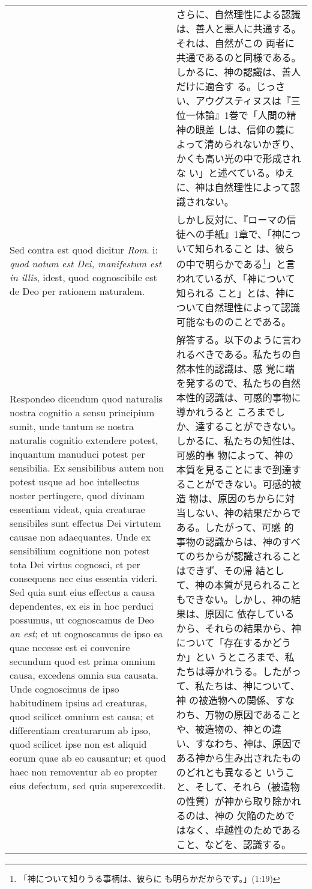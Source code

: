 \documentclass[10pt]{jsarticle} %
\begin{document}
\begin{longtable}{p{21em}p{21em}}
&

さらに、自然理性による認識は、善人と悪人に共通する。それは、自然がこの
両者に共通であるのと同様である。しかるに、神の認識は、善人だけに適合す
る。じっさい、アウグスティヌスは『三位一体論』1巻で「人間の精神の眼差
しは、信仰の義によって清められないかぎり、かくも高い光の中で形成されな
い」と述べている。ゆえに、神は自然理性によって認識されない。

\\


{\sc Sed contra est} quod dicitur {\it Rom}. {\sc i}: {\it quod notum
est Dei, manifestum est in illis}, idest, quod cognoscibile est de Deo
per rationem naturalem.


&

しかし反対に、『ローマの信徒への手紙』1章で、「神について知られること
は、彼らの中で明らかである\footnote{「神について知りうる事柄は、彼らに
も明らかだからです。」(1:19)}」と言われているが、「神について知られる
こと」とは、神について自然理性によって認識可能なもののことである。


\\



{\sc Respondeo dicendum} quod naturalis nostra cognitio a sensu
principium sumit, unde tantum se nostra naturalis cognitio extendere
potest, inquantum manuduci potest per sensibilia. Ex sensibilibus
autem non potest usque ad hoc intellectus noster pertingere, quod
divinam essentiam videat, quia creaturae sensibiles sunt effectus Dei
virtutem causae non adaequantes. Unde ex sensibilium cognitione non
potest tota Dei virtus cognosci, et per consequens nec eius essentia
videri. Sed quia sunt eius effectus a causa dependentes, ex eis in hoc
perduci possumus, ut cognoscamus de Deo {\it an est}; et ut
cognoscamus de ipso ea quae necesse est ei convenire secundum quod est
prima omnium causa, excedens omnia sua causata. Unde cognoscimus de
ipso habitudinem ipsius ad creaturas, quod scilicet omnium est causa;
et differentiam creaturarum ab ipso, quod scilicet ipse non est
aliquid eorum quae ab eo causantur; et quod haec non removentur ab eo
propter eius defectum, sed quia superexcedit.


&

解答する。以下のように言われるべきである。私たちの自然本性的認識は、感
覚に端を発するので、私たちの自然本性的認識は、可感的事物に導かれうると
ころまでしか、達することができない。しかるに、私たちの知性は、可感的事
物によって、神の本質を見ることにまで到達することができない。可感的被造
物は、原因のちからに対当しない、神の結果だからである。したがって、可感
的事物の認識からは、神のすべてのちからが認識されることはできず、その帰
結として、神の本質が見られることもできない。しかし、神の結果は、原因に
依存しているから、それらの結果から、神について「存在するかどうか」とい
うところまで、私たちは導かれうる。したがって、私たちは、神について、神
の被造物への関係、すなわち、万物の原因であることや、被造物の、神との違
い、すなわち、神は、原因である神から生み出されたもののどれとも異なると
いうこと、そして、それら（被造物の性質）が神から取り除かれるのは、神の
欠陥のためではなく、卓越性のためであること、などを、認識する。



\end{longtable}
\end{document}
